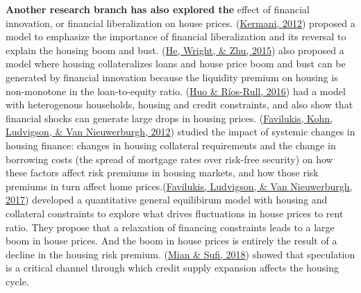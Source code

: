 \documentclass[
  12pt,
]{article}
\begin{document}
\textbf{Another research branch has also explored the} effect of financial innovation, or financial liberalization on house prices. (\protect\hyperlink{ref-kermani_cheap_2012}{Kermani, 2012}) proposed a model to emphasize the importance of financial liberalization and its reversal to explain the housing boom and bust. (\protect\hyperlink{ref-he_housing_2015}{He, Wright, \& Zhu, 2015}) also proposed a model where housing collateralizes loans and house price boom and bust can be generated by financial innovation because the liquidity premium on housing is non-monotone in the loan-to-equity ratio. (\protect\hyperlink{ref-huo_financial_2016}{Huo \& Ríos-Rull, 2016}) had a model with heterogenous households, housing and credit constraints, and also show that financial shocks can generate large drops in housing prices. (\protect\hyperlink{ref-favilukis_international_2012}{Favilukis, Kohn, Ludvigson, \& Van Nieuwerburgh, 2012}) studied the impact of systemic changes in housing finance: changes in housing collateral requirements and the change in borrowing costs (the spread of mortgage rates over risk-free security) on how these factors affect risk premiums in housing markets, and how those risk premiums in turn affect home prices.(\protect\hyperlink{ref-favilukis_macroeconomic_2017}{Favilukis, Ludvigson, \& Van Nieuwerburgh, 2017}) developed a quantitative general equilibirum model with housing and collateral constraints to explore what drives fluctuations in house prices to rent ratio. They propose that a relaxation of financing constraints leads to a large boom in house prices. And the boom in house prices is entirely the result of a decline in the housing risk premium. (\protect\hyperlink{ref-mian_credit_2018}{Mian \& Sufi, 2018}) showed that speculation is a critical channel through which credit supply expansion affects the housing cycle.
\end{document}

